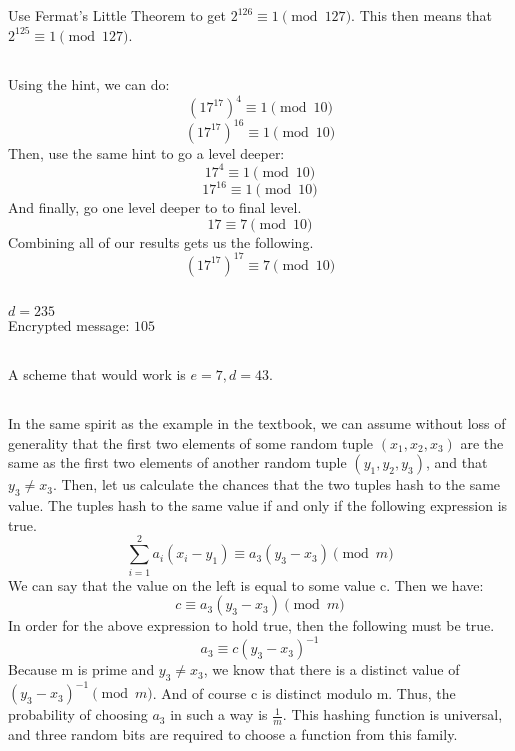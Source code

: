 \documentclass{article}
\begin{document}
\subsection{}Use Fermat's Little Theorem to get $2^{126} \equiv 1 \pmod {127}$. This then means that $2^{125} \equiv 1 \pmod {127}$.
\subsection{}Using the hint, we can do:
$$(17^{17})^4 \equiv 1 \pmod {10}$$
$$(17^{17})^{16} \equiv 1 \pmod {10}$$
Then, use the same hint to go a level deeper:
$$17^4 \equiv 1 \pmod{10}$$
$$17^{16} \equiv 1 \pmod{10}$$
And finally, go one level deeper to to final level. 
$$17 \equiv 7 \pmod{10}$$
Combining all of our results gets us the following. 
$$(17^{17})^{17} \equiv 7 \pmod{10}$$
\subsection{}
$d=235$\\
Encrypted message: $105$
\subsection{}
A scheme that would work is $e=7, d=43$. 
\subsection{}
\subsubsection{}
In the same spirit as the example in the textbook, we can assume without loss of generality that the first two elements of some random tuple $(x_1, x_2, x_3)$ are the same as the first two elements of another random tuple $(y_1, y_2, y_3)$, and that $y_3 \neq x_3$. Then, let us calculate the chances that the two tuples hash to the same value. The tuples hash to the same value if and only if the following expression is true. 
$$\sum_{i=1}^2a_i(x_i-y_1) \equiv a_3(y_3-x_3) \pmod m$$
We can say that the value on the left is equal to some value c. Then we have:
$$c \equiv a_3(y_3-x_3) \pmod m$$
In order for the above expression to hold true, then the following must be true. 
$$a_3 \equiv c(y_3-x_3)^{-1}$$
Because m is prime and $y_3 \neq x_3$, we know that there is a distinct value of $(y_3-x_3)^{-1} \pmod m$. And of course c is distinct modulo m. Thus, the probability of choosing $a_3$ in such a way is $\frac{1}{m}$. This hashing function is universal, and three random bits are required to choose a function from this family. 
\end{document}
